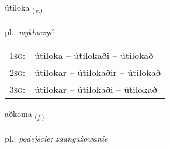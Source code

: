 \documentclass[frontgrid, backgrid]{flacards}\usepackage[]{graphicx}\usepackage[]{xcolor}
\begin{document}
\renewcommand{\flhead}{\vskip5pt \fboxsep=0pt {\small\bfseries\footnotesize Sagnorð | czasownik}}
\renewcommand{\fcfoot}{\vskip5pt \fboxsep=0pt \hspace{2pt}{\small\bfseries\footnotesize 3K}}

\renewcommand{\blhead}{\vskip5pt {\small\bfseries\footnotesize Sagnorð | czasownik }}
\renewcommand{\bcfoot}{\vskip5pt \hspace{2pt}{\small\bfseries\footnotesize 3K}}


{útiloka \small{\textsubscript{(\textit{v.})}} \\[1ex] %
\textphonetic{[uːtɪlɔka]} \\
pl.: \emph{wykluczyć} \\  [2ex]
\renewcommand*{\arraystretch}{0.8}
\begin{tabular}{p{1cm}l}
\textsc{1sg}: & útiloka -- útilokaði -- útilokað \\ 
\textsc{2sg}: & útilokar -- útilokaðir -- útilokað \\ 
\textsc{3sg}: & útilokar -- útilokaði -- útilokað \\ 
\end{tabular}
}

\renewcommand{\flhead}{\vskip5pt \fboxsep=0pt {\small\bfseries\footnotesize Nafnorð | rzeczownik}}
\renewcommand{\fcfoot}{\vskip5pt \fboxsep=0pt \hspace{2pt}{\small\bfseries\footnotesize 3K}}

\renewcommand{\blhead}{\vskip5pt {\small\bfseries\footnotesize Nafnorð | rzeczownik }}
\renewcommand{\bcfoot}{\vskip5pt \hspace{2pt}{\small\bfseries\footnotesize 3K}}


{aðkoma \small{\textsubscript{(\textit{f.})}} \\[1ex] %
\textphonetic{[aðkʰɔma]} \\
pl.: \emph{podejście; zaangażowanie} \\  [2ex]
\renewcommand*{\arraystretch}{0.8}
}
\end{document}
